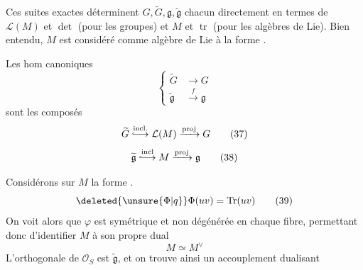 Ces suites exactes déterminent $G,\widetilde G,\mathfrak g,\widetilde{\mathfrak g}$ chacun directement en termes de $\mathcal L(M)$ et $\det$ (pour les groupes) et $M$ et $\operatorname{tr}$ (pour les algèbres de Lie). Bien entendu, $M$ est considéré comme algèbre de Lie  à la forme .

Les hom canoniques
\[
\left\{\begin{aligned}
\widetilde G&\longrightarrow G\\
\widetilde{\mathfrak g}&\xrightarrow{f}\mathfrak g
\end{aligned}\right.\tag*{(36}
\]
sont les composés
\[
\widetilde G\overset{\mathrm{incl.}}{\lhook\joinrel\longrightarrow}\mathcal L(M)\xrightarrow{\mathrm{proj}}G\tag*{(37)}
\]
\[
\widetilde{\mathfrak g}\overset{\mathrm{incl}}{\lhook\joinrel\longrightarrow}M\xrightarrow{\mathrm{proj}}\mathfrak g\tag*{(38)}
\]

Considérons sur $M$ la forme   .
\[
\deleted{\unsure{\Phi|q}}\Phi(uv)=\operatorname{Tr}(uv)\tag*{(39)}
\]
On voit alors que $\varphi$ est symétrique et  non dégénérée en chaque fibre, permettant donc d'identifier $M$ à son propre dual
\[
M\simeq M^\vee\tag*{(40)}
\]
L'orthogonale de $\mathcal O_S$ est $\widetilde{\mathfrak g}$, et on trouve ainsi un accouplement dualisant

